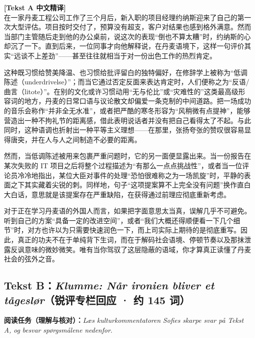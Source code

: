 \begin{transbox}
\small
\textbf{\color{NCDTeal}[Tekst A 中文精译]}\\
在一家丹麦工程公司工作了三个月后，新入职的项目经理约纳斯迎来了自己的第一次大型评估。项目按时交付了，预算没有超支，客户对结果也感到格外满意。然而当部门主管随后走到他的办公桌前，说这次的表现“倒也不算太糟”时，约纳斯的心却沉了一下。直到后来，一位同事才向他解释说，在丹麦语境下，这样一句评价其实“远谈不上差劲”——甚至往往就相当于对一份出色工作的热烈肯定。

这种既习惯给赞美降温、也习惯给批评留白的独特偏好，在修辞学上被称为“低调陈述（underdrivelse）”；而当它通过否定反面来表达肯定时，人们便称之为“反语/曲言（litote）”。在别的文化或许习惯动用“无与伦比”或“灾难性的”这类最高级形容词的地方，丹麦的日常口语与议论散文却偏爱一条克制的中间道路。把一场成功的音乐会称作“并非全无水准”，或者把严酷的寒冬形容为“风稍微有点提神”，能够营造出一种不拘礼节的距离感，借此表明说话者并没有把自己看得太了不起。与此同时，这种语调也折射出一种平等主义理想——在那里，张扬夸张的赞叹很容易显得唐突，并在人与人之间制造不必要的距离。

然而，当低调陈述被用来包裹严重问题时，它的另一面便显露出来。当一份报告在某次失败的 IT 项目之后将整个过程描述为“有那么一点点挑战性”，或者当一位评论员冷冷地指出，某位大臣对事件的处理“恐怕很难称之为一场凯旋”时，平静的表面之下其实藏着尖锐的刺。同样地，句子“这项提案算不上完全没有问题”换作直白大白话，意思就是该提案存在严重缺陷，在获得通过前理应彻底重新考虑。

对于正在学习丹麦语的外国人而言，如果把字面意思太当真，误解几乎不可避免。听到自己的方案“具备一定的改进空间”，或者“我们大概还得顺便看一下几个细节”时，对方也许以为只需要快速润色一下，而上司实际上期待的是彻底重写。因此，真正的功夫不在于单纯背下生词，而在于解码社会语境、停顿节奏以及那抹泄露反讽意味的微妙微笑。唯有当你驾驭了这层隐蔽的语域，你才算真正读懂了丹麦社会的弦外之音。
\end{transbox}

\subsection*{Tekst B：\textit{Klumme: Når ironien bliver et tågeslør}（锐评专栏回应 · 约 145 词）}

\textbf{阅读任务（理解与核对）：}\textit{Læs kulturkommentatoren Sofies skarpe svar på Tekst A, og besvar spørgsmålene nedenfor.}

